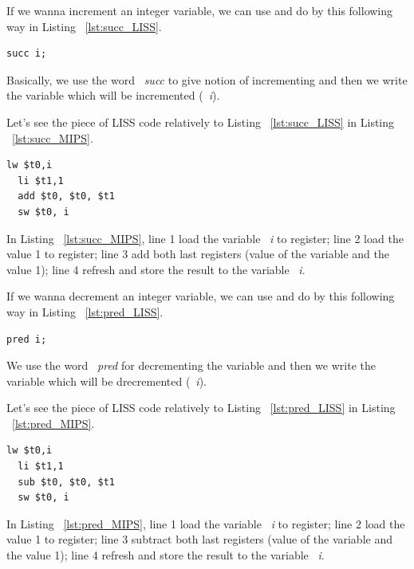 \documentclass[
  oneside,
  11pt, a4paper,
  footinclude=true,
  headinclude=true,
  cleardoublepage=empty
]{scrbook}
\begin{document}
If we wanna increment an integer variable, we can use and do by this following way in Listing ~\ref{lst:succ_LISS}.

\begin{lstlisting}[caption={Increment variable in LISS},label={lst:succ_LISS}]
  succ i;
\end{lstlisting}

Basically, we use the word ~\textit{succ} to give notion of incrementing and then we write the variable which will be incremented (~\textit{i}).

Let's see the piece of LISS code relatively to Listing ~\ref{lst:succ_LISS} in Listing ~\ref{lst:succ_MIPS}.

\begin{lstlisting}[caption={Code generated for the LISS code in Listing ~\ref{lst:succ_LISS}},label={lst:succ_MIPS}]
  lw $t0,i		
  li $t1,1		
  add $t0, $t0, $t1	
  sw $t0, i		
\end{lstlisting}

In Listing ~\ref{lst:succ_MIPS}, line 1 load the variable ~\textit{i} to register; line 2 load the value 1 to register; line 3 add both last registers (value of the variable and the value 1); line 4 refresh and store the result to the variable ~\textit{i}.

If we wanna decrement an integer variable, we can use and do by this following way in Listing ~\ref{lst:pred_LISS}.

\begin{lstlisting}[caption={Decrement variable in LISS},label={lst:pred_LISS}]
  pred i;
\end{lstlisting}

We use the word ~\textit{pred} for decrementing the variable and then we write the variable which will be drecremented (~\textit{i}).

Let's see the piece of LISS code relatively to Listing ~\ref{lst:pred_LISS} in Listing ~\ref{lst:pred_MIPS}.

\begin{lstlisting}[caption={Code generated for the LISS code in Listing ~\ref{lst:pred_MIPS}},label={lst:pred_MIPS}] 
  lw $t0,i		
  li $t1,1		
  sub $t0, $t0, $t1	
  sw $t0, i		
\end{lstlisting}

In Listing ~\ref{lst:pred_MIPS}, line 1 load the variable ~\textit{i} to register; line 2 load the value 1 to register; line 3 subtract both last registers (value of the variable and the value 1); line 4 refresh and store the result to the variable ~\textit{i}.
\end{document}
